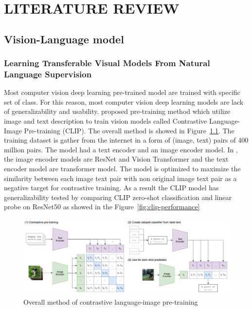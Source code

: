 \chapter{LITERATURE REVIEW}

\section{Vision-Language model}
\subsection{Learning Transferable Visual Models From Natural Language Supervision}
Most computer vision deep learning pre-trained model are trained with specific set of class.
For this reason, most computer vision deep learning models are lack of generalizability and usability.
 proposed pre-training method which utilize image and text description to train vision models called Contrastive Language-Image Pre-training (CLIP).
The overall method is showed in Figure~\ref{fig:clip}.
The training dataset is gather from the internet in a form of (image, text) pairs of 400 million pairs.
The model had a text encoder and an image encoder model.
In , the image encoder models are ResNet and Vision Transformer and the text encoder model are transformer model.
The model is optimized to maximize the similarity between each image text pair with non original image text pair as a negative target for contrastive training.
As a result the CLIP model has generalizability tested by comparing CLIP zero-shot classification and linear probe on ResNet50 as showed in the Figure~\ref{fig:clip-performance}

\begin{figure}[h]
    \label{fig:clip}
    \caption{Overall method of contrastive language-image pre-training}
    \centering
    \includegraphics[width=1\textwidth]{Images/CLIP.png}
    \small
\end{figure}

